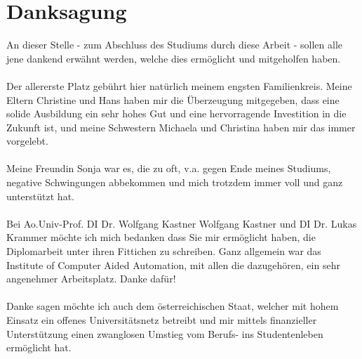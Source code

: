 \chapter*{Danksagung}

An dieser Stelle - zum Abschluss des Studiums durch diese Arbeit - sollen alle jene dankend erwähnt werden, welche dies ermöglicht und mitgeholfen haben.
\\
\\
Der allererste Platz gebührt hier natürlich meinem engsten Familienkreis. Meine Eltern Christine und Hans haben mir die Überzeugung mitgegeben, dass eine solide Ausbildung ein
sehr hohes Gut und eine hervorragende Investition in die Zukunft ist, und meine Schwestern Michaela und Christina haben mir das immer vorgelebt.
\\
\\
Meine Freundin Sonja war es, die zu oft, v.a. gegen Ende meines Studiums, negative Schwingungen abbekommen und mich trotzdem immer voll und ganz unterstützt hat.
\\
\\
Bei Ao.Univ-Prof. DI Dr. Wolfgang Kastner Wolfgang Kastner und DI Dr. Lukas Krammer möchte ich mich bedanken dass Sie mir ermöglicht haben, die Diplomarbeit unter ihren Fittichen
zu schreiben. Ganz allgemein war das Institute of Computer Aided Automation, mit allen die dazugehören, ein sehr angenehmer Arbeitsplatz. Danke dafür!
\\
\\
Danke sagen möchte ich auch dem österreichischen Staat, welcher mit hohem Einsatz ein offenes Universitätsnetz betreibt und mir mittels finanzieller Unterstützung
einen zwanglosen Umstieg vom Berufs- ins Studentenleben ermöglicht hat.